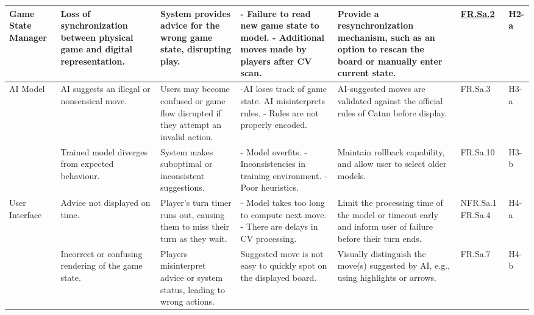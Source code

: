 \documentclass{article}
\begin{document}
\begin{landscape}
\begin{tabularx}{\linewidth}{|P{2.3cm}|Y|Y|Y|Y|P{1.4cm}|P{0.8cm}|}
        \hline

        Game State Manager &
        Loss of synchronization between physical game and digital representation. &
        System provides advice for the wrong game state, disrupting play. &
        - Failure to read new game state to model. \newline - Additional moves made by players after CV scan. &
        Provide a resynchronization mechanism, such as an option to rescan the board or manually enter current state. &
        \hyperref[fr-sa]{FR.Sa.2} &
        H2-a \\

        \hline

        AI Model &
        AI suggests an illegal or nonsensical move. &
        Users may become confused or game flow disrupted if they attempt an invalid action. &
        -AI loses track of game state. \newline AI misinterprets rules. \newline - Rules are not properly encoded. &
        AI-suggested moves are validated against the official rules of Catan before display. &
        FR.Sa.3 &
        H3-a \\

        &
        Trained model diverges from expected behaviour. &
        System makes suboptimal or inconsistent suggestions. &
        - Model overfits. \newline - Inconsistencies in training environment. \newline - Poor heuristics. &
        Maintain rollback capability, and allow user to select older models. &
        FR.Sa.10 &
        H3-b \\

        \hline

        User Interface &
        Advice not displayed on time. &
        Player's turn timer runs out, causing them to miss their turn as they wait. &
        - Model takes too long to compute next move. \newline - There are delays in CV processing. &
        Limit the processing time of the model or timeout early and inform user of failure before their turn ends. &
        NFR.Sa.1 \newline FR.Sa.4 &
        H4-a \\

        &
        Incorrect or confusing rendering of the game state. &
        Players misinterpret advice or system status, leading to wrong actions. &
        Suggested move is not easy to quickly spot on the displayed board. &
        Visually distinguish the move(s) suggested by AI, e.g., using highlights or arrows. &
        FR.Sa.7 &
        H4-b \\


\end{tabularx}
\end{landscape}
\end{document}
